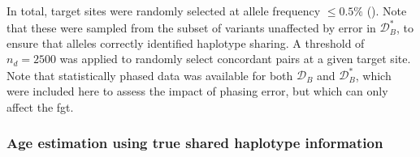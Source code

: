 In total,  target sites were randomly selected at allele frequency ${\leq 0.5\%}$ (\fk{[2,25]}).
Note that these were sampled from the subset of variants unaffected by error in $\mathcal{D}_B^{\ast}$, to ensure that alleles correctly identified haplotype sharing.
A threshold of ${n_d = \num{2500}}$ was applied to randomly select concordant pairs at a given target site.
Note that statistically phased data was available for both $\mathcal{D}_B$ and $\mathcal{D}_B^{\ast}$, which were included here to assess the impact of phasing error, but which can only affect the \gls{fgt}.


% 

%
\subsubsection{Age estimation using true shared haplotype information}
%

